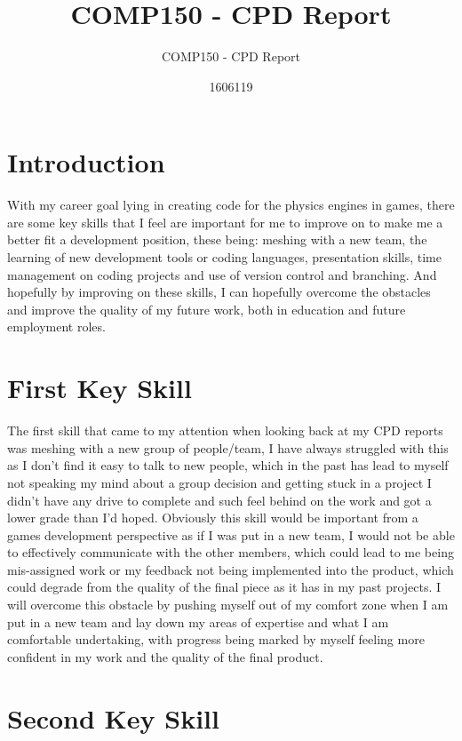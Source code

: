 \documentclass{scrartcl}
\title{COMP150 - CPD Report}
\subtitle{COMP150 - CPD Report}
\author{1606119}
\begin{document}
\maketitle

\section{Introduction}

With my career goal lying in creating code for the physics engines in games, there are some key skills that I feel are important for me to improve on to make me a better fit a development position, these being: meshing with a new team, the learning of new development tools or coding languages, presentation skills, time management on coding projects and use of version control and branching. And hopefully by improving on these skills, I can hopefully overcome the obstacles and improve the quality of my future work, both in education and future employment roles.

\section{First Key Skill}

The first skill that came to my attention when looking back at my CPD reports was meshing with a new group of people/team, I have always struggled with this as I don't find it easy to talk to new people, which in the past has lead to myself not speaking my mind about a group decision and getting stuck in a project I didn't have any drive to complete and such feel behind on the work and got a lower grade than I'd hoped. Obviously this skill would be important from a games development perspective as if I was put in a new team, I would not be able to effectively communicate with the other members, which could lead to me being mis-assigned work or my feedback not being implemented into the product, which could degrade from the quality of the final piece as it has in my past projects. I will overcome this obstacle by pushing myself out of my comfort zone when I am put in a new team and lay down my areas of expertise and what I am comfortable undertaking, with progress being marked by myself feeling more confident in my work and the quality of the final product. 


\section{Second Key Skill}
\end{document}
